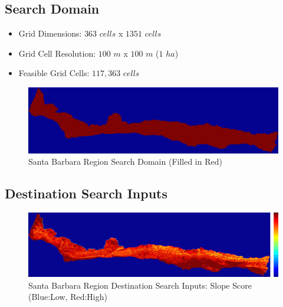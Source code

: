     \subsection{Search Domain}
    
    \begin{itemize}
      \setlength{\itemsep}{0cm}
      \setlength{\parskip}{0cm}
        \item Grid Dimensions: $363$ $cells$ x $1351$ $cells$
        \item Grid Cell Resolution: $100$ $m$ x $100$ $m$ ($1$ $ha$)
        \item Feasible Grid Cells: $117,363$ $cells$
    \end{itemize}
    
        \begin{figure}[!h]
            \begin{center}
            \includegraphics[width=5.5in]{figures/SantaBarbara_SearchDomain.png}   
            \caption{Santa Barbara Region Search Domain (Filled in Red)}
            \label{fig:SBdomain}
            \end{center}
        \end{figure}
        
    \subsection{Destination Search Inputs}
    
        \begin{figure}[!h]
            \begin{center}
            \includegraphics[width=5.5in]{figures/SantaBarbara_Search_Slope.png}   
            \caption{Santa Barbara Region Destination Search Inputs: Slope Score (Blue:Low, Red:High)}
            \label{fig:SBdsinputs_slope}
            \end{center}
        \end{figure}
        
